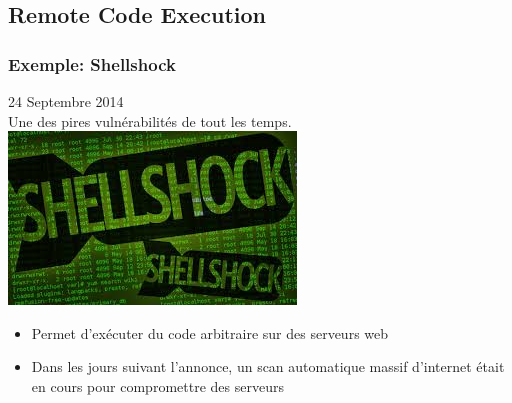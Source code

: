 \subsection{Remote Code Execution}
\begin{frame}
\frametitle{Exemple: Shellshock}

\begin{center}
    24 Septembre 2014\\
    Une des pires vulnérabilités de tout les temps.\\
    \vspace{2em}
    \includegraphics[scale=0.54]{res/shellshock}
    \begin{itemize}
        \item Permet d'exécuter du code arbitraire sur des serveurs web
        \item Dans les jours suivant l'annonce, un scan automatique massif d'internet était en cours pour compromettre des serveurs
    \end{itemize}
\end{center}
\end{frame}





